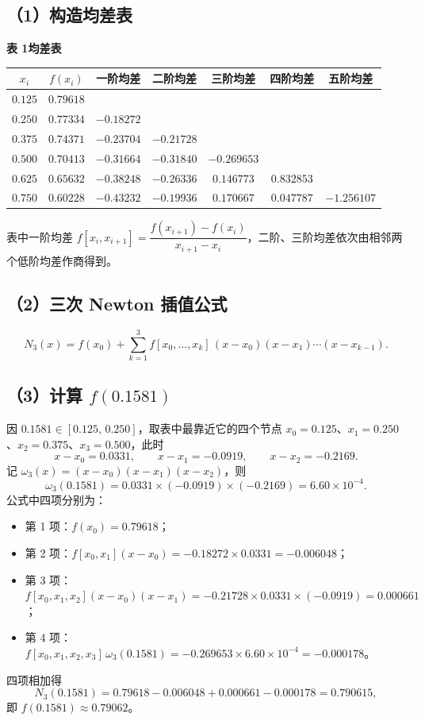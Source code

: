 \documentclass[a4paper,11pt]{ctexart}
\begin{document}
\subsection*{（1）构造均差表}
\begin{center}
  {\small\bfseries 表 1\quad 均差表}\\[0.4em]
  \renewcommand{\arraystretch}{1.2}
  \begin{tabular}{ccccccc}
    \toprule
    $x_i$ & $f(x_i)$ & 一阶均差 & 二阶均差 & 三阶均差 & 四阶均差 & 五阶均差 \\
    \midrule
    $0.125$ & $0.79618$ &            &            &            &            &            \\
    $0.250$ & $0.77334$ & $-0.18272$ &            &            &            &            \\
    $0.375$ & $0.74371$ & $-0.23704$ & $-0.21728$ &            &            &            \\
    $0.500$ & $0.70413$ & $-0.31664$ & $-0.31840$ & $-0.269653$ &           &            \\
    $0.625$ & $0.65632$ & $-0.38248$ & $-0.26336$ & $0.146773$  & $0.832853$ &            \\
    $0.750$ & $0.60228$ & $-0.43232$ & $-0.19936$ & $0.170667$  & $0.047787$ & $-1.256107$ \\
    \bottomrule
  \end{tabular}
\end{center}
{\small 表中一阶均差 $f[x_i,x_{i+1}]=\dfrac{f(x_{i+1})-f(x_i)}{x_{i+1}-x_i}$，二阶、三阶均差依次由相邻两个低阶均差作商得到。}

\subsection*{（2）三次 Newton 插值公式}
\[
  N_3(x)=f(x_0)+\sum_{k=1}^{3}f[x_0,\ldots,x_k]\,
  (x-x_0)(x-x_1)\cdots(x-x_{k-1}) .
\]

\subsection*{（3）计算 $f(0.1581)$}
因 $0.1581\in[0.125,\,0.250]$，取表中最靠近它的四个节点
$x_0=0.125$、$x_1=0.250$、$x_2=0.375$、$x_3=0.500$，此时
\[
  x-x_0=0.0331,\qquad x-x_1=-0.0919,\qquad x-x_2=-0.2169 .
\]
记 $\omega_3(x)=(x-x_0)(x-x_1)(x-x_2)$，则
\[
  \omega_3(0.1581)=0.0331\times(-0.0919)\times(-0.2169)=6.60\times 10^{-4}.
\]
公式中四项分别为：
\begin{itemize}\setlength{\itemsep}{0.15em}
  \item[] 第 1 项：$f(x_0)=0.79618$；
  \item[] 第 2 项：$f[x_0,x_1](x-x_0)=-0.18272\times0.0331=-0.006048$；
  \item[] 第 3 项：$f[x_0,x_1,x_2](x-x_0)(x-x_1)
        =-0.21728\times0.0331\times(-0.0919)=0.000661$；
  \item[] 第 4 项：$f[x_0,x_1,x_2,x_3]\,\omega_3(0.1581)
        =-0.269653\times6.60\times10^{-4}=-0.000178$。
\end{itemize}
四项相加得
\[
  N_3(0.1581)=0.79618-0.006048+0.000661-0.000178=0.790615 ,
\]
即 $f(0.1581)\approx 0.79062$。
\end{document}

